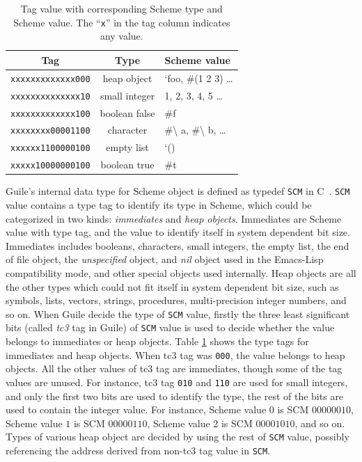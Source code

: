 \documentclass[preprint, 10pt]{sigplanconf}
\begin{document}
\begin{table}
  \begin{center}
  \begin{tabular}{ccl}
    Tag&Type&Scheme value\\
    \toprule
    \texttt{xxxxxxxxxxxxx000} & heap object & `foo, \#(1 2 3) \ldots \\
    \texttt{xxxxxxxxxxxxxx10} & small integer & 1, 2, 3, 4, 5 \ldots \\
    \texttt{xxxxxxxxxxxxx100} & boolean false & \#f \\
    \texttt{xxxxxxxx00001100} & character & \#\textbackslash{} a,
    \#\textbackslash{} b, \ldots \\
    \texttt{xxxxxx1100000100} & empty list & `() \\
    \texttt{xxxxx10000000100} & boolean true & \#t \\
  \end{tabular}
  \end{center}
  \caption{Tag value with corresponding Scheme type and Scheme value. The
    ``\texttt{x}'' in the tag column indicates any value.}
\label{tab:tags}
\end{table}

Guile's internal data type for Scheme object is defined as typedef \texttt{SCM}
in C~\cite{Galassi02guilereference}. \texttt{SCM} value contains a type tag to
identify its type in Scheme, which could be categorized in two kinds:
\textit{immediates} and \textit{heap objects}. Immediates are Scheme value with
type tag, and the value to identify itself in system dependent bit
size. Immediates includes booleans, characters, small integers, the empty list,
the end of file object, the \textit{unspecified} object, and \textit{nil} object
used in the Emacs-Lisp compatibility mode, and other special objects used
internally. Heap objects are all the other types which could not fit itself in
system dependent bit size, such as symbols, lists, vectors, strings, procedures,
multi-precision integer numbers, and so on.  When Guile decide the type of
\texttt{SCM} value, firstly the three least significant bits (called
\textit{tc3} tag in Guile) of \texttt{SCM} value is used to decide whether the
value belongs to immediates or heap objects. Table
\hyperref[tab:tags]{\ref{tab:tags}} shows the type tags for immediates and heap
objects. When tc3 tag was \texttt{000}, the value belongs to heap objects. All
the other values of tc3 tag are immediates, though some of the tag values are
unused. For instance, tc3 tag \texttt{010} and \texttt{110} are used for small
integers, and only the first two bits are used to identify the type, the rest of
the bits are used to contain the integer value. For instance, Scheme value $0$
is SCM $00000010$, Scheme value $1$ is SCM $00000110$, Scheme value 2 is SCM
$00001010$, and so on. Types of various heap object are decided by using the
rest of \texttt{SCM} value, possibly referencing the address derived from
non-tc3 tag value in \texttt{SCM}.
\end{document}
